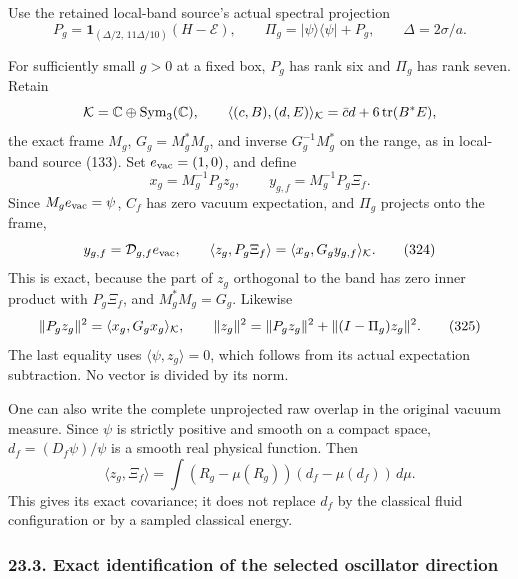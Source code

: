 \documentclass[
  11pt,
]{article}
\begin{document}
Use the retained local-band source's actual spectral projection \[
 P_g=\mathbf1_{(\Delta/2,\,11\Delta/10)}(H-\mathcal E),\qquad
 \Pi_g=|\psi\rangle\langle\psi|+P_g,\qquad
 \Delta=2\sigma/a .
\]

For sufficiently small \(g>0\) at a fixed box, \(P_g\) has rank six and
\(\Pi_g\) has rank seven. Retain \[
 {\cal K}=\mathbb C\oplus\operatorname{Sym}_3(\mathbb C),\qquad
 \langle(c,B),(d,E)\rangle_{\cal K}=\bar c d+6\operatorname{tr}(B^*E),
\] the exact frame \(M_g\), \(G_g=M_g^*M_g\), and inverse
\(G_g^{-1}M_g^*\) on the range, as in local-band source (133). Set
\(e_{\rm vac}=(1,0)\), and define \[
 x_g=M_g^{-1}P_g z_g,\qquad
 y_{g,f}=M_g^{-1}P_g\Xi_f.
\] Since \(M_ge_{\rm vac}=\psi\), \(C_f\) has zero vacuum expectation,
and \(\Pi_g\) projects onto the frame, \[
 y_{g,f}={\cal D}_{g,f}e_{\rm vac},\qquad
 \langle z_g,P_g\Xi_f\rangle
       =\langle x_g,G_g y_{g,f}\rangle_{\cal K}.
 \tag{324}
\] This is exact, because the part of \(z_g\) orthogonal to the band has
zero inner product with \(P_g\Xi_f\), and \(M_g^*M_g=G_g\). Likewise \[
 \|P_g z_g\|^2=\langle x_g,G_gx_g\rangle_{\cal K},\qquad
 \|z_g\|^2=\|P_gz_g\|^2+\|(I-\Pi_g)z_g\|^2.
 \tag{325}
\] The last equality uses \(\langle\psi,z_g\rangle=0\), which follows
from its actual expectation subtraction. No vector is divided by its
norm.

One can also write the complete unprojected raw overlap in the original
vacuum measure. Since \(\psi\) is strictly positive and smooth on a
compact space, \(d_f=(D_f\psi)/\psi\) is a smooth real physical
function. Then \[
 \langle z_g,\Xi_f\rangle
 =\int (R_g-\mu(R_g))(d_f-\mu(d_f))\,d\mu.
 \tag{326}
\] This gives its exact covariance; it does not replace \(d_f\) by the
classical fluid configuration or by a sampled classical energy.

\subsubsection{23.3. Exact identification of the selected oscillator
direction}\label{exact-identification-of-the-selected-oscillator-direction}
\end{document}

